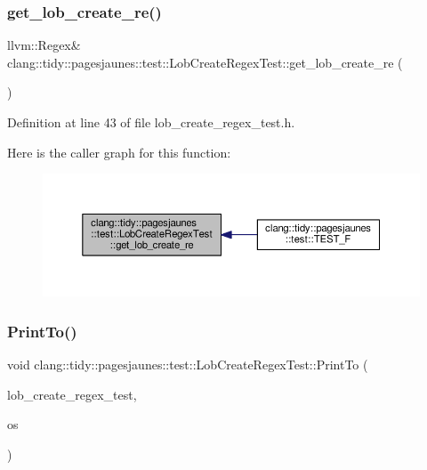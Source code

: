 \subsubsection{\texorpdfstring{get\+\_\+lob\+\_\+create\+\_\+re()}{get\_lob\_create\_re()}}
{\footnotesize\ttfamily llvm\+::\+Regex\& clang\+::tidy\+::pagesjaunes\+::test\+::\+Lob\+Create\+Regex\+Test\+::get\+\_\+lob\+\_\+create\+\_\+re (\begin{DoxyParamCaption}{ }\end{DoxyParamCaption})\hspace{0.3cm}{\ttfamily [inline]}}



Definition at line 43 of file lob\+\_\+create\+\_\+regex\+\_\+test.\+h.

Here is the caller graph for this function\+:
\nopagebreak
\begin{figure}[H]
\begin{center}
\leavevmode
\includegraphics[width=350pt]{classclang_1_1tidy_1_1pagesjaunes_1_1test_1_1_lob_create_regex_test_a1a59a46c1639717884b2fc92e5740e17_icgraph}
\end{center}
\end{figure}
\mbox{\label{classclang_1_1tidy_1_1pagesjaunes_1_1test_1_1_lob_create_regex_test_a41753553921067dbb040b2a778791bd8}} 
\subsubsection{\texorpdfstring{Print\+To()}{PrintTo()}}
{\footnotesize\ttfamily void clang\+::tidy\+::pagesjaunes\+::test\+::\+Lob\+Create\+Regex\+Test\+::\+Print\+To (\begin{DoxyParamCaption}\item[{const \hyperlink{classclang_1_1tidy_1_1pagesjaunes_1_1test_1_1_lob_create_regex_test}{Lob\+Create\+Regex\+Test} \&}]{lob\+\_\+create\+\_\+regex\+\_\+test,  }\item[{\+::std\+::ostream $\ast$}]{os }\end{DoxyParamCaption})}



